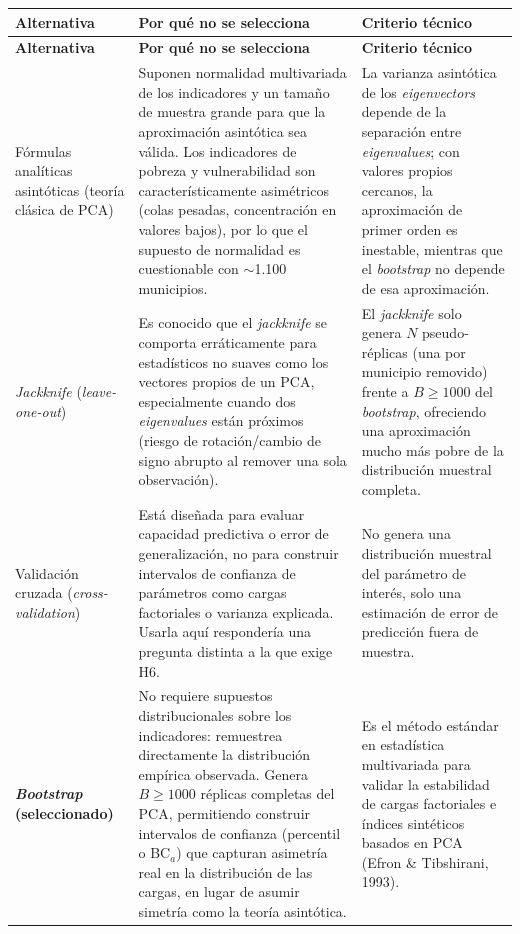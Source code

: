 \documentclass[11pt,letterpaper]{article}
\begin{document}
\begin{center}
\small
\begin{longtable}{p{2.8cm}p{5.9cm}p{4.8cm}}
\toprule
\textbf{Alternativa} & \textbf{Por qué no se selecciona} & \textbf{Criterio técnico} \\
\midrule
\endfirsthead
\toprule
\textbf{Alternativa} & \textbf{Por qué no se selecciona} & \textbf{Criterio técnico} \\
\midrule
\endhead
Fórmulas analíticas asintóticas (teoría clásica de PCA) & Suponen normalidad multivariada de los indicadores y un tamaño de muestra grande para que la aproximación asintótica sea válida. Los indicadores de pobreza y vulnerabilidad son característicamente asimétricos (colas pesadas, concentración en valores bajos), por lo que el supuesto de normalidad es cuestionable con $\sim$1.100 municipios. & La varianza asintótica de los \textit{eigenvectors} depende de la separación entre \textit{eigenvalues}; con valores propios cercanos, la aproximación de primer orden es inestable, mientras que el \textit{bootstrap} no depende de esa aproximación. \\
\textit{Jackknife} (\textit{leave-one-out}) & Es conocido que el \textit{jackknife} se comporta erráticamente para estadísticos no suaves como los vectores propios de un PCA, especialmente cuando dos \textit{eigenvalues} están próximos (riesgo de rotación/cambio de signo abrupto al remover una sola observación). & El \textit{jackknife} solo genera $N$ pseudo-réplicas (una por municipio removido) frente a $B\geq 1000$ del \textit{bootstrap}, ofreciendo una aproximación mucho más pobre de la distribución muestral completa. \\
Validación cruzada (\textit{cross-validation}) & Está diseñada para evaluar capacidad predictiva o error de generalización, no para construir intervalos de confianza de parámetros como cargas factoriales o varianza explicada. Usarla aquí respondería una pregunta distinta a la que exige H6. & No genera una distribución muestral del parámetro de interés, solo una estimación de error de predicción fuera de muestra. \\
\textbf{\textit{Bootstrap} (seleccionado)} & No requiere supuestos distribucionales sobre los indicadores: remuestrea directamente la distribución empírica observada. Genera $B\geq 1000$ réplicas completas del PCA, permitiendo construir intervalos de confianza (percentil o BC$_a$) que capturan asimetría real en la distribución de las cargas, en lugar de asumir simetría como la teoría asintótica. & Es el método estándar en estadística multivariada para validar la estabilidad de cargas factoriales e índices sintéticos basados en PCA (Efron \& Tibshirani, 1993). \\
\bottomrule
\end{longtable}
\end{center}
\end{document}
